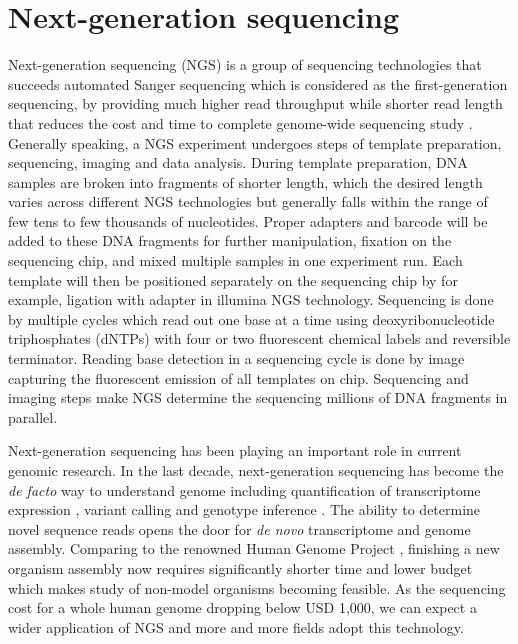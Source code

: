 \section{Next-generation sequencing}
\label{s:ngs}

Next-generation sequencing (NGS) is a group of sequencing technologies that
succeeds automated Sanger sequencing which is considered as the
first-generation sequencing, by providing much higher read throughput while
shorter read length that reduces the cost and time to complete genome-wide
sequencing study \cite{metzker2010:sequencing}. Generally speaking, a NGS
experiment undergoes steps of template preparation, sequencing, imaging and
data analysis. During template preparation, DNA samples are broken into
fragments of shorter length, which the desired length varies across different
NGS technologies but generally falls within the range of few tens to few
thousands of nucleotides. Proper adapters and barcode will be added to these
DNA fragments for further manipulation, fixation on the sequencing chip, and
mixed multiple samples in one experiment run. Each template will then be
positioned separately on the sequencing chip by for example, ligation with
adapter in illumina NGS technology. Sequencing is done by multiple cycles which
read out one base at a time using deoxyribonucleotide triphosphates (dNTPs)
with four or two fluorescent chemical labels and reversible terminator. Reading
base detection in a sequencing cycle is done by image capturing the fluorescent
emission of all templates on chip. Sequencing and imaging steps make NGS
determine the sequencing millions of DNA fragments in parallel.

Next-generation sequencing has been playing an important role in current
genomic research. In the last decade, next-generation sequencing has become the
\textit{de facto} way to understand genome \cite{vandijk2014:ten} including
quantification of transcriptome expression \cite{wang2009:rnaseq}, variant
calling and genotype inference \cite{nielsen2011:genotype}. The ability to
determine novel sequence reads opens the door for \textit{de novo}
transcriptome and genome assembly. Comparing to the renowned Human Genome
Project \cite{lander2001:initial}, finishing a new organism assembly now
requires significantly shorter time and lower budget which makes study of
non-model organisms becoming feasible. As the sequencing cost for a whole human
genome dropping below USD 1,000, we can expect a wider application of NGS and
more and more fields adopt this technology.

